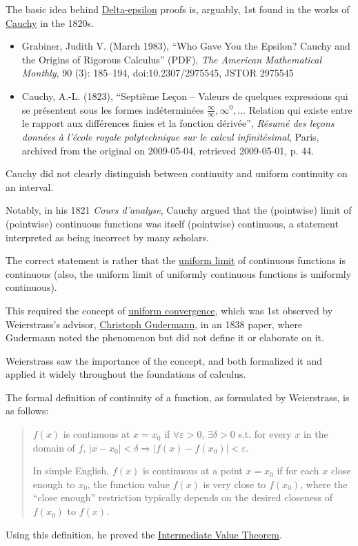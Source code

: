 \documentclass{book}
\numberwithin{equation}{section}
\begin{document}
%
The basic idea behind \href{https://en.wikipedia.org/wiki/(%CE%B5,_%CE%B4)-definition_of_limit}{Delta-epsilon} proofs is, arguably, 1st found in the works of \href{https://en.wikipedia.org/wiki/Augustin-Louis_Cauchy}{Cauchy} in the 1820s.
\begin{itemize}
    \item Grabiner, Judith V. (March 1983), ``Who Gave You the Epsilon? Cauchy and the Origins of Rigorous Calculus'' (PDF), \textit{The American Mathematical Monthly}, 90 (3): 185--194, doi:10.2307/2975545, JSTOR 2975545
    \item Cauchy, A.-L. (1823), ``Septième Leçon – Valeurs de quelques expressions qui se présentent sous les formes indéterminées $\frac{\infty}{\infty},\infty^0,\ldots$ Relation qui existe entre le rapport aux différences finies et la fonction dérivée'', \textit{Résumé des leçons données à l'école royale polytechnique sur le calcul infinitésimal}, Paris, archived from the original on 2009-05-04, retrieved 2009-05-01, p. 44.
\end{itemize}
Cauchy did not clearly distinguish between continuity and uniform continuity on an interval.

Notably, in his 1821 \textit{Cours d'analyse}, Cauchy argued that the (pointwise) limit of (pointwise) continuous functions was itself (pointwise) continuous, a statement interpreted as being incorrect by many scholars.

The correct statement is rather that the \href{https://en.wikipedia.org/wiki/Uniform_limit}{uniform limit} of continuous functions is continuous (also, the uniform limit of uniformly continuous functions is uniformly continuous).

This required the concept of \href{https://en.wikipedia.org/wiki/Uniform_convergence}{uniform convergence}, which was 1st observed by Weierstrass's advisor, \href{https://en.wikipedia.org/wiki/Christoph_Gudermann}{Christoph Gudermann}, in an 1838 paper, where Gudermann noted the phenomenon but did not define it or elaborate on it.

Weierstrass saw the importance of the concept, and both formalized it and applied it widely throughout the foundations of calculus.

%
The formal definition of continuity of a function, as formulated by Weierstrass, is as follows:
\begin{quotation}
    $f(x)$ is continuous at $x = x_0$ if $\forall\varepsilon > 0$, $\exists\delta > 0$ s.t. for every $x$ in the domain of $f$, $|x - x_0| < \delta\Rightarrow|f(x) - f(x_0)| < \varepsilon$.
    
    In simple English, $f(x)$ is continuous at a point $x = x_0$ if for each $x$ close enough to $x_0$, the function value $f(x)$ is very close to $f(x_0)$, where the ``close enough'' restriction typically depends on the desired closeness of $f(x_0)$ to $f(x)$.
\end{quotation}
Using this definition, he proved the \href{https://en.wikipedia.org/wiki/Intermediate_value_theorem}{Intermediate Value Theorem}.
\end{document}
